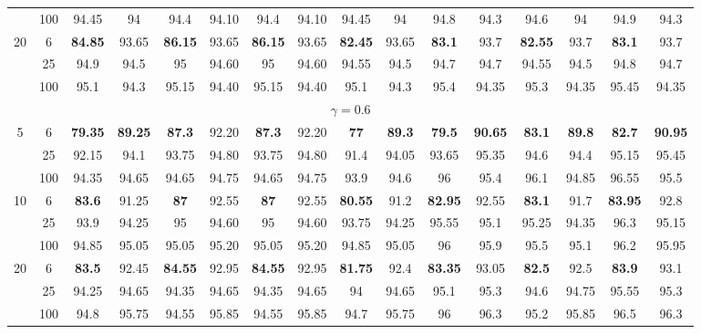 \documentclass[
  man]{apa6}
\newenvironment{lltable}{\begin{landscape}\centering\begin{ThreePartTable}}{\end{ThreePartTable}\end{landscape}}
\begin{document}
\begin{lltable}
{\begin{longtable}{cccccccccccccccc}
 & 100 & 94.45 & 94 & 94.4 & 94.10 & 94.4 & 94.10 & 94.45 & 94 & 94.8 & 94.3 & 94.6 & 94 & 94.9 & 94.3\\
20 & 6 & \textbf{84.85} & 93.65 & \textbf{86.15} & 93.65 & \textbf{86.15} & 93.65 & \textbf{82.45} & 93.65 & \textbf{83.1} & 93.7 & \textbf{82.55} & 93.7 & \textbf{83.1} & 93.7\\
 & 25 & 94.9 & 94.5 & 95 & 94.60 & 95 & 94.60 & 94.55 & 94.5 & 94.7 & 94.7 & 94.55 & 94.5 & 94.8 & 94.7\\
 & 100 & 95.1 & 94.3 & 95.15 & 94.40 & 95.15 & 94.40 & 95.1 & 94.3 & 95.4 & 94.35 & 95.3 & 94.35 & 95.45 & 94.35\\
\multicolumn{16}{c}{$\gamma = 0.6$}\\
5 & 6 & \textbf{79.35} & \textbf{89.25} & \textbf{87.3} & 92.20 & \textbf{87.3} & 92.20 & \textbf{77} & \textbf{89.3} & \textbf{79.5} & \textbf{90.65} & \textbf{83.1} & \textbf{89.8} & \textbf{82.7} & \textbf{90.95}\\
 & 25 & 92.15 & 94.1 & 93.75 & 94.80 & 93.75 & 94.80 & 91.4 & 94.05 & 93.65 & 95.35 & 94.6 & 94.4 & 95.15 & 95.45\\
 & 100 & 94.35 & 94.65 & 94.65 & 94.75 & 94.65 & 94.75 & 93.9 & 94.6 & 96 & 95.4 & 96.1 & 94.85 & 96.55 & 95.5\\
10 & 6 & \textbf{83.6} & 91.25 & \textbf{87} & 92.55 & \textbf{87} & 92.55 & \textbf{80.55} & 91.2 & \textbf{82.95} & 92.55 & \textbf{83.1} & 91.7 & \textbf{83.95} & 92.8\\
 & 25 & 93.9 & 94.25 & 95 & 94.60 & 95 & 94.60 & 93.75 & 94.25 & 95.55 & 95.1 & 95.25 & 94.35 & 96.3 & 95.15\\
 & 100 & 94.85 & 95.05 & 95.05 & 95.20 & 95.05 & 95.20 & 94.85 & 95.05 & 96 & 95.9 & 95.5 & 95.1 & 96.2 & 95.95\\
20 & 6 & \textbf{83.5} & 92.45 & \textbf{84.55} & 92.95 & \textbf{84.55} & 92.95 & \textbf{81.75} & 92.4 & \textbf{83.35} & 93.05 & \textbf{82.5} & 92.5 & \textbf{83.9} & 93.1\\
 & 25 & 94.25 & 94.65 & 94.35 & 94.65 & 94.35 & 94.65 & 94 & 94.65 & 95.1 & 95.3 & 94.6 & 94.75 & 95.55 & 95.3\\
 & 100 & 94.8 & 95.75 & 94.55 & 95.85 & 94.55 & 95.85 & 94.7 & 95.75 & 96 & 96.3 & 95.2 & 95.85 & 96.5 & 96.3\\
\bottomrule
\end{longtable}

}

\end{lltable}
\end{document}
